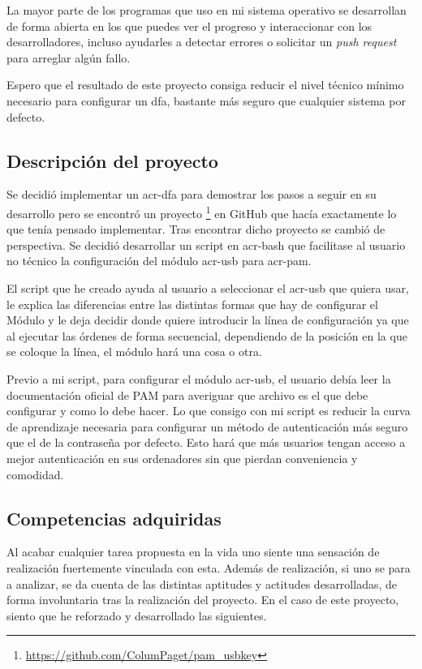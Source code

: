 \documentclass[titlepage, 12pt, a4paper]{article}
\begin{document}
La mayor parte de los programas que uso en mi sistema operativo se desarrollan de forma abierta en los que puedes ver el progreso y interaccionar con los desarrolladores, incluso ayudarles a detectar errores o solicitar un \textit{push request} para arreglar algún fallo.\par
Espero que el resultado de este proyecto consiga reducir el nivel técnico mínimo necesario para configurar un \gls{dfa}, bastante más seguro que cualquier sistema por defecto.
\subsection{Descripción del proyecto}
Se decidió implementar un \gls{acr-dfa} para demostrar los pasos a seguir en su desarrollo pero se encontró un proyecto \footnote{\url{https://github.com/ColumPaget/pam_usbkey}} en \gls{GitHub} que hacía exactamente lo que tenía pensado implementar. Tras encontrar dicho proyecto se cambió de perspectiva. Se decidió desarrollar un \gls{script} en \gls{acr-bash} que facilitase al usuario no técnico la configuración del módulo \gls{acr-usb} para \gls{acr-pam}.\par
El \gls{script} que he creado ayuda al usuario a seleccionar el \gls{acr-usb} que quiera usar, le explica las diferencias entre las distintas formas que hay de configurar el Módulo y le deja decidir donde quiere introducir la línea de configuración ya que al ejecutar las órdenes de forma secuencial, dependiendo de la posición en la que se coloque la línea, el módulo hará una cosa o otra. \par
Previo a mi \gls{script}, para configurar el módulo \gls{acr-usb}, el usuario debía leer la documentación oficial de PAM para averiguar que archivo es el que debe configurar y como lo debe hacer. Lo que consigo con mi \gls{script} es reducir la curva de aprendizaje necesaria para configurar un método de autenticación más seguro que el de la contraseña por defecto. Esto hará que más usuarios tengan acceso a mejor autenticación en sus ordenadores sin que pierdan conveniencia y comodidad.
\subsection{Competencias adquiridas}
Al acabar cualquier tarea propuesta en la vida uno siente una sensación de realización fuertemente vinculada con esta. Además de realización, si uno se para a analizar, se da cuenta de las distintas aptitudes y actitudes desarrolladas, de forma involuntaria tras la realización del proyecto. En el caso de este proyecto, siento que he reforzado y desarrollado las siguientes.
\end{document}
